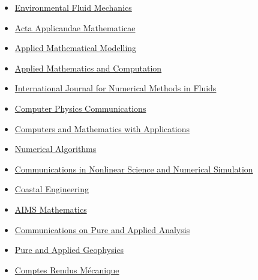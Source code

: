\documentclass[final, a4paper, oneside, 12pt]{article}
\numberwithin{equation}{section}
\begin{document}
\begin{itemize}
    \item \href{https://link.springer.com/journal/10652/}%
    {Environmental Fluid Mechanics}

    \item \href{https://link.springer.com/journal/10440/}%
    {Acta Applicandae Mathematicae}
    
    \item \href{http://www.journals.elsevier.com/applied-mathematical-modelling/}%
    {Applied Mathematical Modelling}
    
    \item \href{http://www.journals.elsevier.com/applied-mathematics-and-computation/}%
    {Applied Mathematics and Computation}

    \item \href{https://onlinelibrary.wiley.com/journal/10970363/}%
    {International Journal for Numerical Methods in Fluids}
    
    \item \href{https://www.journals.elsevier.com/computer-physics-communications}{Computer Physics Communications}
    
    \item \href{http://www.journals.elsevier.com/computers-and-mathematics-with-applications/}%
    {Computers and Mathematics with Applications}
    
    \item \href{http://www.springerlink.com/content/101751/}{Numerical Algorithms}
    
    \item \href{http://www.journals.elsevier.com/communications-in-nonlinear-science-and-numerical-simulation}%
    {Communications in Nonlinear Science and Numerical Simulation}

    \item \href{https://www.sciencedirect.com/journal/coastal-engineering/}{Coastal Engineering}

    \item \href{https://www.aimspress.com/journal/Math/}{AIMS Mathematics}
   
    \item \href{http://aimsciences.org/journals/cpaa/}%
    {Communications on Pure and Applied Analysis}

    \item \href{https://www.springer.com/journal/24}%
    {Pure and Applied Geophysics}
    
    \item \href{http://www.sciencedirect.com/science/journal/16310721}%
    {Comptes Rendus M\'ecanique}
    

\end{itemize}
\end{document}
